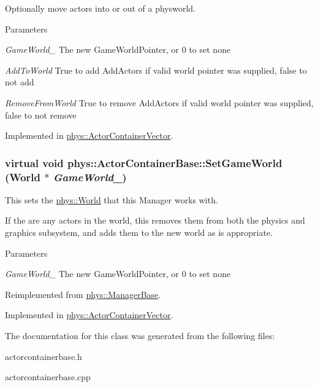 Optionally move actors into or out of a physworld. 


\begin{DoxyParams}{Parameters}
\item[{\em GameWorld\_\-}]The new GameWorldPointer, or 0 to set none \item[{\em AddToWorld}]True to add AddActors if valid world pointer was supplied, false to not add \item[{\em RemoveFromWorld}]True to remove AddActors if valid world pointer was supplied, false to not remove \end{DoxyParams}


Implemented in \hyperlink{classphys_1_1ActorContainerVector_a721d0cde6fc4f1e8d3b33867cd5c82df}{phys::ActorContainerVector}.

\hypertarget{classphys_1_1ActorContainerBase_ae0cb5c288f17507247dd98d3a2466876}{
\subsubsection[{SetGameWorld}]{\setlength{\rightskip}{0pt plus 5cm}virtual void phys::ActorContainerBase::SetGameWorld ({\bf World} $\ast$ {\em GameWorld\_\-})}}
\label{d1/d00/classphys_1_1ActorContainerBase_ae0cb5c288f17507247dd98d3a2466876}


This sets the \hyperlink{classphys_1_1World}{phys::World} that this Manager works with. 

If the are any actors in the world, this removes them from both the physics and graphics subsystem, and adds them to the new world as is appropriate. 
\begin{DoxyParams}{Parameters}
\item[{\em GameWorld\_\-}]The new GameWorldPointer, or 0 to set none \end{DoxyParams}


Reimplemented from \hyperlink{classphys_1_1ManagerBase_a97eb1e77c1f7a0925fc623836368a262}{phys::ManagerBase}.



Implemented in \hyperlink{classphys_1_1ActorContainerVector_ab4c1394254057465f7a2f89b87dc49aa}{phys::ActorContainerVector}.



The documentation for this class was generated from the following files:\begin{DoxyCompactItemize}
\item 
actorcontainerbase.h\item 
actorcontainerbase.cpp\end{DoxyCompactItemize}
